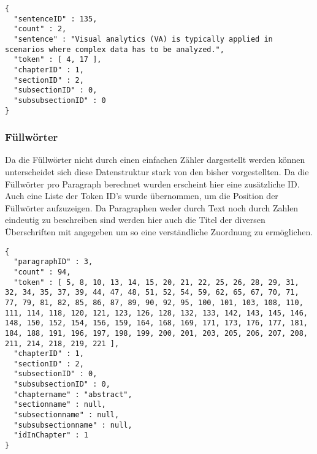 \begin{lstlisting}
{
  "sentenceID" : 135,
  "count" : 2,
  "sentence" : "Visual analytics (VA) is typically applied in scenarios where complex data has to be analyzed.",
  "token" : [ 4, 17 ],
  "chapterID" : 1,
  "sectionID" : 2,
  "subsectionID" : 0,
  "subsubsectionID" : 0
}
\end{lstlisting}

\subsubsection*{Füllwörter}
Da die Füllwörter nicht durch einen einfachen Zähler dargestellt werden können unterscheidet sich diese Datenstruktur stark von den bisher vorgestellten. Da die Füllwörter pro Paragraph berechnet wurden erscheint hier eine zusätzliche ID. Auch eine Liste der Token ID's wurde übernommen, um die Position der Füllwörter aufzuzeigen. Da Paragraphen weder durch Text noch durch Zahlen eindeutig zu beschreiben sind werden hier auch die Titel der diversen Überschriften mit angegeben um so eine verständliche Zuordnung zu ermöglichen. 

\begin{lstlisting}
{
  "paragraphID" : 3,
  "count" : 94,
  "token" : [ 5, 8, 10, 13, 14, 15, 20, 21, 22, 25, 26, 28, 29, 31, 32, 34, 35, 37, 39, 44, 47, 48, 51, 52, 54, 59, 62, 65, 67, 70, 71, 77, 79, 81, 82, 85, 86, 87, 89, 90, 92, 95, 100, 101, 103, 108, 110, 111, 114, 118, 120, 121, 123, 126, 128, 132, 133, 142, 143, 145, 146, 148, 150, 152, 154, 156, 159, 164, 168, 169, 171, 173, 176, 177, 181, 184, 188, 191, 196, 197, 198, 199, 200, 201, 203, 205, 206, 207, 208, 211, 214, 218, 219, 221 ],
  "chapterID" : 1,
  "sectionID" : 2,
  "subsectionID" : 0,
  "subsubsectionID" : 0,
  "chaptername" : "abstract",
  "sectionname" : null,
  "subsectionname" : null,
  "subsubsectionname" : null,
  "idInChapter" : 1
}
\end{lstlisting}
